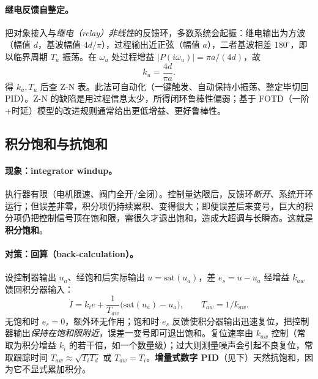 
\paragraph{继电反馈自整定。}
把对象接入与\emph{继电（relay）非线性}的反馈环，多数系统会起振：继电输出为方波（幅值 $d$，基波幅值 $4d/\pi$），过程输出近正弦（幅值 $a$），二者基波相差 $180^\circ$，即以临界周期 $T_u$ 振荡\cite{astrom2008feedback}。在 $\omega_u$ 处过程增益 $|P(i\omega_u)|=\pi a/(4d)$，故
\begin{equation}
  k_u=\frac{4d}{\pi a}.
  \label{eq:ctrl-relay}
\end{equation}
得 $k_u,T_u$ 后查 Z-N 表。此法可自动化（一键触发、自动保持小振荡、整定毕切回 PID）。Z-N 的缺陷是用过程信息太少，所得闭环鲁棒性偏弱；基于 FOTD（一阶+时延）模型的改进规则通常给出更低增益、更好鲁棒性\cite{astrom2008feedback}。

\subsection{积分饱和与抗饱和}
\label{sec:ctrl-pid-windup}

\paragraph{现象：integrator windup。}
执行器有限（电机限速、阀门全开/全闭）。控制量达限后，反馈环\emph{断开}、系统开环运行；但误差非零，积分项仍持续累积、变得很大；即便误差后来变号，巨大的积分项仍把控制信号顶在饱和限，需很久才退出饱和，造成大超调与长瞬态。这就是\textbf{积分饱和}\cite{astrom2008feedback}。

\paragraph{对策：回算（back-calculation）。}
设控制器输出 $u_a$、经饱和后实际输出 $u=\mathrm{sat}(u_a)$，差 $e_s=u-u_a$ 经增益 $k_{aw}$ 馈回积分器输入\cite{astrom2008feedback,khalil2002nonlinear}：
\begin{equation}
  \dot I=k_ie+\frac{1}{T_{aw}}\big(\mathrm{sat}(u_a)-u_a\big),\qquad T_{aw}=1/k_{aw}.
  \label{eq:ctrl-antiwindup}
\end{equation}
无饱和时 $e_s=0$，额外环无作用；饱和时 $e_s$ 反馈使积分器输出迅速复位，把控制器输出\emph{保持在饱和限附近}，误差一变号即可退出饱和。复位速率由 $k_{aw}$ 控制（常取为积分增益 $k_i$ 的若干倍，如一个数量级）；过大则测量噪声会引起不良复位，常取跟踪时间 $T_{aw}\approx\sqrt{T_iT_d}$ 或 $T_{aw}=T_i$。\textbf{增量式数字 PID}（见下）天然抗饱和，因为它不显式累加积分。

